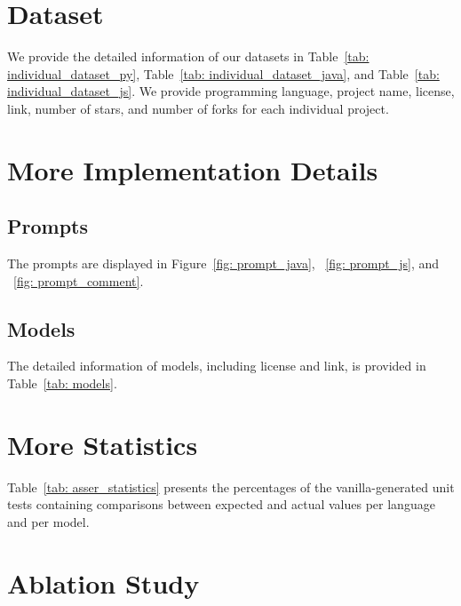 \section{Dataset}
\label{appendix: dataset}
We provide the detailed information of our datasets in Table~\ref{tab: individual_dataset_py}, Table~\ref{tab: individual_dataset_java}, and Table~\ref{tab: individual_dataset_js}. We provide programming language, project name, license, link, number of stars, and number of forks for each individual project.


\section{More Implementation Details}
\subsection{Prompts}
\label{appendix: prompts}

The prompts are displayed in Figure~\ref{fig: prompt_java}, ~\ref{fig: prompt_js}, and ~\ref{fig: prompt_comment}.

\subsection{Models}
\label{appendix: models}

The detailed information of models, including license and link, is provided in Table~\ref{tab: models}.

\section{More Statistics}
\label{appendix: assert_statistics}

Table~\ref{tab: asser_statistics} presents the percentages of the vanilla-generated unit tests containing comparisons between expected and actual values per language and per model.

\section{Ablation Study}
\label{appendix: ablation}

